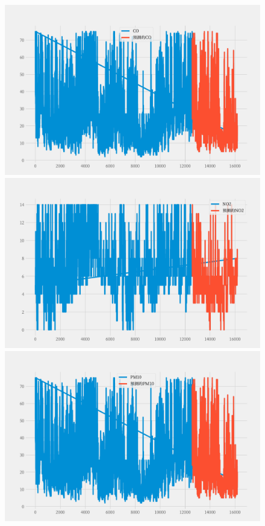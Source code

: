 \documentclass[a4paper,10pt]{my_paper}
\numberwithin{equation}{section}
\begin{document}
\begin{figure}[htbp]
	\centering
		\begin{minipage}[c]{0.3\textwidth} %
			\centering
			\includegraphics[width=1\textwidth]{prob3/预测A地_CO.pdf} %
		\end{minipage}%
		\begin{minipage}[c]{0.3\textwidth}
			\centering
			\includegraphics[width=1\textwidth]{prob3/预测A地_NO2.pdf}
		\end{minipage}
		\begin{minipage}[c]{0.3\textwidth}
			\centering
			\includegraphics[width=1\textwidth]{prob3/预测A地_PM10.pdf}

\end{minipage}
\end{figure}
\end{document}
